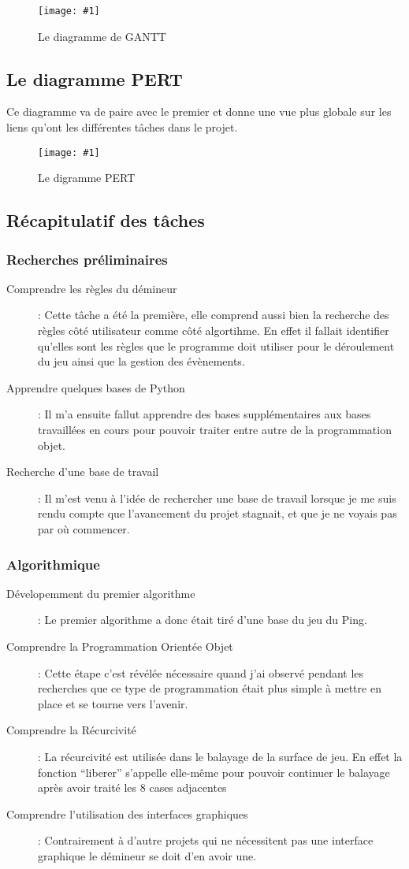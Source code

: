 \documentclass[a4paper,11pt]{article}
\newcommand{\monimage}[4]{
\par\noindent
\begin{figure}[H] %
\begin{center}
\texttt{[image: \#1]} %
\caption{#2} %
\label{#3} %
\end{center}
\end{figure} %
}
\begin{document}
\monimage{GANTTdiagramme.png}{Le diagramme de GANTT}{GANTT}{15}
\subsection{Le diagramme PERT}
Ce diagramme va de paire avec le premier et donne une vue plus globale sur les liens qu'ont les différentes tâches dans
le projet.
\monimage{PERTdiagramme.png}{Le digramme PERT}{PERT}{13}

\subsection{Récapitulatif des tâches}
\subsubsection{Recherches préliminaires}
\begin{description}
 \item[Comprendre les règles du démineur] : Cette tâche a été la première, elle
comprend aussi bien la recherche des règles côté utilisateur comme côté algortihme.
 En effet il fallait identifier qu'elles sont les règles que le programme doit
utiliser pour le déroulement du jeu ainsi que la gestion des évènements.
 \item[Apprendre quelques bases de Python] :  Il m'a ensuite fallut apprendre des
bases supplémentaires aux bases travaillées en cours pour pouvoir traiter
entre autre de la programmation
 objet.
 \item[Recherche d'une base de travail] :  Il m'est venu à l'idée de rechercher
une base de travail lorsque je me suis rendu compte que l'avancement du projet stagnait,
et que je ne voyais pas par où  commencer.
 \end{description}
\subsubsection{Algorithmique}
\begin{description}
 \item [Dévelopemment du premier algorithme] :  Le premier algorithme a donc était tiré d'une base du jeu du Ping.  
 \item [Comprendre la Programmation Orientée Objet] : Cette étape c'est révélée nécessaire quand j'ai observé pendant les recherches que ce type de programmation
 était plus simple à mettre en place et se tourne vers l'avenir.
 \item [Comprendre la Récurcivité] :  La récurcivité est utilisée dans le balayage de la surface de jeu. En effet la fonction ``liberer'' s'appelle elle-même pour pouvoir
 continuer le balayage après avoir traité les 8 cases adjacentes
 \item [Comprendre l'utilisation des interfaces graphiques] :  Contrairement à d'autre projets qui ne nécessitent pas une interface graphique le démineur se doit d'en avoir une.
 \end{description}
\end{document}
